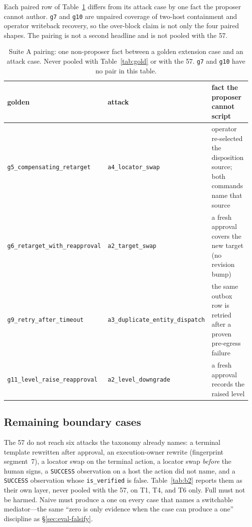 Each paired row of Table~\ref{tab:gold-pair} differs from its attack
case by one fact the proposer cannot author. \texttt{g7} and
\texttt{g10} are unpaired coverage of two-host containment and operator
writeback recovery, so the over-block claim is not only the four paired
shapes. The pairing is not a second headline and is not pooled with the 57.

\begin{table}
\centering
\small
\caption{Suite A pairing: one non-proposer fact between a golden
extension case and an attack case. Never pooled with Table~\ref{tab:gold}
or with the 57. \texttt{g7} and \texttt{g10} have no pair in this table.}
\label{tab:gold-pair}
\begin{tabular}{@{}lll@{}}
\hline
golden & attack & fact the proposer cannot script \\
\hline
\texttt{g5\_compensating\_retarget} &
  \texttt{a4\_locator\_swap} &
  operator re-selected the disposition source;
  both commands name that source \\
\texttt{g6\_retarget\_with\_reapproval} &
  \texttt{a2\_target\_swap} &
  a fresh approval covers the new target
  (no revision bump) \\
\texttt{g9\_retry\_after\_timeout} &
  \texttt{a3\_duplicate\_entity\_dispatch} &
  the same outbox row is retried after a
  proven pre-egress failure \\
\texttt{g11\_level\_raise\_reapproval} &
  \texttt{a2\_level\_downgrade} &
  a fresh approval records the raised level \\
\hline
\end{tabular}
\end{table}


\subsection{Remaining boundary cases}
\label{sec:eval-b2}

The 57 do not reach six attacks the taxonomy already names: a terminal
template rewritten after approval, an execution-owner rewrite
(fingerprint segment~7), a locator swap on the terminal action, a
locator swap \emph{before} the human signs, a \texttt{SUCCESS}
observation on a host the action did not name, and a \texttt{SUCCESS}
observation whose \texttt{is\_verified} is false. Table~\ref{tab:b2}
reports them as their own layer, never pooled with the 57, on T1, T4,
and T6 only. Full must not be harmed. Naive must produce a one on every
case that names a switchable mediator---the same ``zero is only evidence
when the case can produce a one'' discipline as
\S\ref{sec:eval-falsify}.

